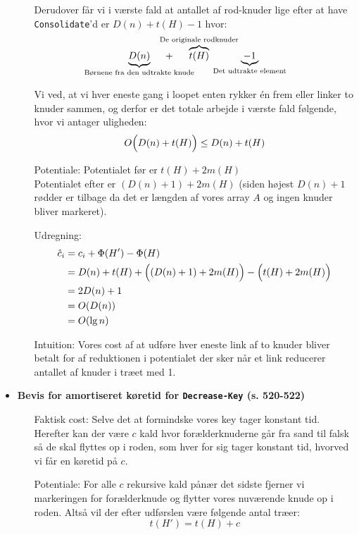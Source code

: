 \begin{itemize}
\begin{itemize}
		Derudover får vi i værste fald at antallet af rod-knuder lige efter at have \texttt{Consolidate}'d er $D(n) + t(H) - 1$ hvor:
		$$
		\underbrace{D(n)}_{\text{\makebox[50pt]{Børnene fra den udtrakte knude}}} + \overbrace{t(H)}^{\text{\makebox[50pt]{De originale rodknuder}}} \underbrace{- 1}_{\text{\makebox[50pt]{Det udtrakte element}}}
		$$
		
		Vi ved, at vi hver eneste gang i loopet enten rykker én frem eller linker to knuder sammen, og derfor er det totale arbejde i værste fald følgende, hvor vi antager uligheden:
		$$
		O \Big(  D(n) + t(H)  \Big) \leq D(n) + t(H)
		$$
		
		
		\item[Potentiale:] Potentialet før er $t(H) + 2m(H)$\\
		Potentialet efter er $(D(n) + 1) + 2m(H)$ (siden højest $D(n) + 1$ rødder er tilbage da det er længden af vores array $A$ og ingen knuder bliver markeret).
		
		\item[Udregning:]
		\begin{align}
		\hat c_i &= c_i + \Phi(H') - \Phi(H)\\
		    &= D(n) + t(H) + \Big( (D(n) + 1) + 2m(H) \Big) - \Big(  t(H) + 2m(H)  \Big) \label{eq:reduce} \\
		    &= 2D(n) + 1 \label{eq:dominate} \\
		    &= O(D(n)) \nonumber \\
		    &= O(\lg n) \nonumber
		\end{align}		
		
		\item[Intuition:] Vores cost af at udføre hver eneste link af to knuder bliver betalt for af reduktionen i potentialet der sker når et link reducerer antallet af knuder i træet med 1.
\end{itemize}



\item \textbf{Bevis for amortiseret køretid for \texttt{Decrease-Key} (s. 520-522)}
\begin{itemize}
	\item[Faktisk cost:] Selve det at formindske vores key tager konstant tid. Herefter kan der være $c$ kald hvor forælderknuderne går fra sand til falsk så de skal flyttes op i roden, som hver for sig tager konstant tid, hvorved vi får en køretid på $c$.
	
	\item[Potentiale:] For alle $c$ rekursive kald pånær det sidste fjerner vi markeringen for forælderknude og flytter vores nuværende knude op i roden. Altså vil der efter udførslen være følgende antal træer:
	$$
	t(H') = t(H) + c
	$$
	

\end{itemize}
\end{itemize}
